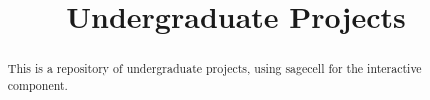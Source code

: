 \documentclass{xourse}
\title{Undergraduate  Projects}%
\begin{document}
      
\begin{abstract} %
This is a repository of undergraduate  projects, using sagecell for the interactive component.
\end{abstract}
      
\maketitle
      




      
\end{document}
